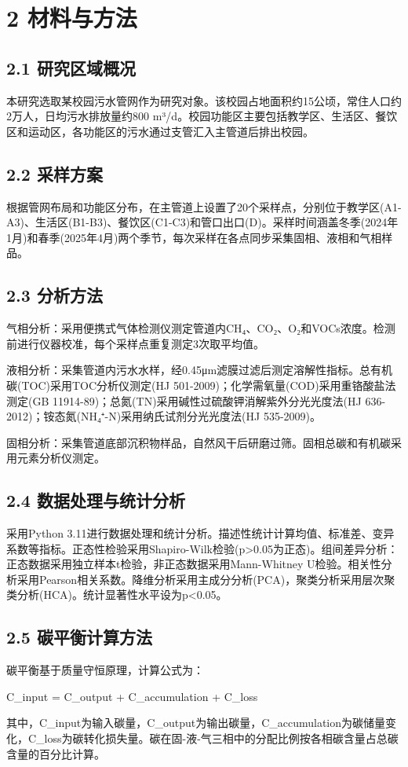 \section{2 材料与方法}

\subsection{2.1 研究区域概况}

本研究选取某校园污水管网作为研究对象。该校园占地面积约15公顷，常住人口约2万人，日均污水排放量约800 m³/d。校园功能区主要包括教学区、生活区、餐饮区和运动区，各功能区的污水通过支管汇入主管道后排出校园。

\subsection{2.2 采样方案}

根据管网布局和功能区分布，在主管道上设置了20个采样点，分别位于教学区(A1-A3)、生活区(B1-B3)、餐饮区(C1-C3)和管口出口(D)。采样时间涵盖冬季(2024年1月)和春季(2025年4月)两个季节，每次采样在各点同步采集固相、液相和气相样品。

\subsection{2.3 分析方法}

气相分析：采用便携式气体检测仪测定管道内CH₄、CO₂、O₂和VOCs浓度。检测前进行仪器校准，每个采样点重复测定3次取平均值。

液相分析：采集管道内污水水样，经0.45μm滤膜过滤后测定溶解性指标。总有机碳(TOC)采用TOC分析仪测定(HJ 501-2009)；化学需氧量(COD)采用重铬酸盐法测定(GB 11914-89)；总氮(TN)采用碱性过硫酸钾消解紫外分光光度法(HJ 636-2012)；铵态氮(NH₄⁺-N)采用纳氏试剂分光光度法(HJ 535-2009)。

固相分析：采集管道底部沉积物样品，自然风干后研磨过筛。固相总碳和有机碳采用元素分析仪测定。

\subsection{2.4 数据处理与统计分析}

采用Python 3.11进行数据处理和统计分析。描述性统计计算均值、标准差、变异系数等指标。正态性检验采用Shapiro-Wilk检验(p>0.05为正态)。组间差异分析：正态数据采用独立样本t检验，非正态数据采用Mann-Whitney U检验。相关性分析采用Pearson相关系数。降维分析采用主成分分析(PCA)，聚类分析采用层次聚类分析(HCA)。统计显著性水平设为p<0.05。

\subsection{2.5 碳平衡计算方法}

碳平衡基于质量守恒原理，计算公式为：

C\_input = C\_output + C\_accumulation + C\_loss

其中，C\_input为输入碳量，C\_output为输出碳量，C\_accumulation为碳储量变化，C\_loss为碳转化损失量。碳在固-液-气三相中的分配比例按各相碳含量占总碳含量的百分比计算。